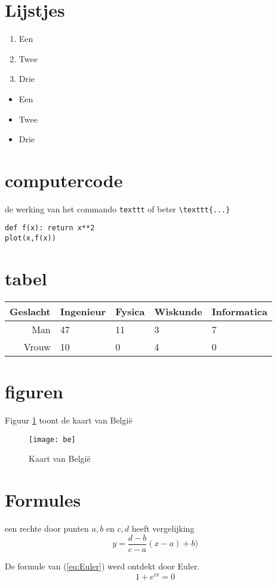 \documentclass{article}
\begin{document}
\section{Lijstjes}
\label{sec:Lijstjes}
\begin{enumerate}
	\item Een
	\item Twee
	\item Drie
\end{enumerate}
\begin{itemize}
	\item Een
	\item Twee
	\item Drie
\end{itemize}
\section{computercode}
\label{sec:computercode}
de werking van het commando
\texttt{texttt} of beter
\verb|\texttt{...}|

\begin{verbatim}
def f(x): return x**2
plot(x,f(x))
\end{verbatim}
\section{tabel}
\begin{tabular}{r|llll}
	Geslacht & Ingenieur & Fysica & Wiskunde & Informatica \\ \hline
	     Man & 47        & 11     & 3        & 7           \\
	   Vrouw & 10        & 0      & 4        & 0
\end{tabular}

\section{figuren}
Figuur \ref{fig:eucl} toont de kaart van België
\begin{figure}
\centering
\texttt{[image: be]} 
\caption{Kaart van België}
\label{fig:eucl}
\end{figure}

\section{Formules}
een rechte door punten \(a,b\) en \(c,d\) heeft vergelijking
\[y=\frac{d-b}{c-a}(x-a)+b)\]

De formule van (\ref{eq:Euler}) werd ontdekt door Euler.
\begin{equation}
1+e^{i\pi}=0
\label{eq:Euler}
\end{equation}
\end{document}

